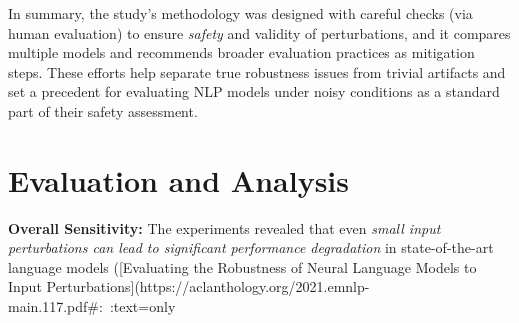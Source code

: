 In summary, the study’s methodology was designed with careful checks (via human evaluation) to ensure \textit{safety} and validity of perturbations, and it compares multiple models and recommends broader evaluation practices as mitigation steps. These efforts help separate true robustness issues from trivial artifacts and set a precedent for evaluating NLP models under noisy conditions as a standard part of their safety assessment.

\section{Evaluation and Analysis}
\textbf{Overall Sensitivity:} The experiments revealed that even \textit{small input perturbations can lead to significant performance degradation} in state-of-the-art language models ([Evaluating the Robustness of Neural Language Models to Input Perturbations](https://aclanthology.org/2021.emnlp-main.117.pdf#:~:text=only%

